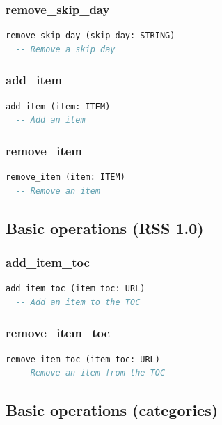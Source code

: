 \subsubsection{remove\_skip\_day}

\begin{lstlisting}[language=Eiffel]
remove_skip_day (skip_day: STRING)
  -- Remove a skip day
\end{lstlisting}

\subsubsection{add\_item}

\begin{lstlisting}[language=Eiffel]
add_item (item: ITEM)
  -- Add an item
\end{lstlisting}

\subsubsection{remove\_item}

\begin{lstlisting}[language=Eiffel]
remove_item (item: ITEM)
  -- Remove an item
\end{lstlisting}

\subsection{Basic operations (RSS 1.0)}
\label{sec:channel-basic-operations-rss10}

\subsubsection{add\_item\_toc}

\begin{lstlisting}[language=Eiffel]
add_item_toc (item_toc: URL)
  -- Add an item to the TOC  
\end{lstlisting}

\subsubsection{remove\_item\_toc}

\begin{lstlisting}[language=Eiffel]
remove_item_toc (item_toc: URL)
  -- Remove an item from the TOC
\end{lstlisting}

\subsection{Basic operations (categories)}
\label{sec:channel-basic-operations-categories}

